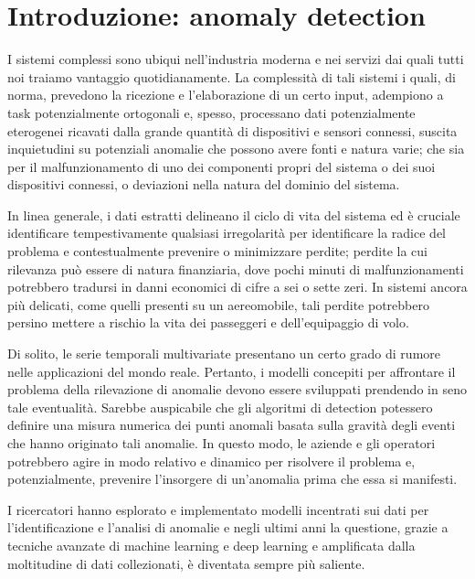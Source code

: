     

\chapter{Introduzione: anomaly detection} \label{cap:intro}
    I sistemi complessi sono ubiqui nell'industria moderna e nei servizi dai quali tutti noi traiamo vantaggio 
    quotidianamente. La complessità di 
    tali sistemi i quali, di norma, prevedono la ricezione e l'elaborazione di un certo input, adempiono a task 
    potenzialmente ortogonali e, spesso, processano dati potenzialmente eterogenei ricavati dalla grande 
    quantità di dispositivi e sensori connessi, suscita inquietudini su potenziali anomalie che possono avere
    fonti e natura varie; che sia per il malfunzionamento di uno dei componenti propri del sistema o 
    dei suoi dispositivi connessi, o deviazioni nella natura del dominio del sistema. 
    
    In linea generale, i dati estratti delineano il ciclo di vita del sistema ed è cruciale identificare tempestivamente
    qualsiasi irregolarità per identificare la radice del problema e 
    contestualmente prevenire o minimizzare perdite; perdite la cui rilevanza può essere di natura finanziaria, 
    dove pochi minuti di malfunzionamenti potrebbero tradursi in danni economici di cifre a sei o sette zeri. In sistemi ancora 
    più delicati, come quelli presenti su un aereomobile, tali perdite potrebbero persino mettere a 
    rischio la vita dei passeggeri e dell'equipaggio di volo.

    Di solito, le serie temporali multivariate presentano un certo grado di rumore nelle applicazioni del 
    mondo reale. Pertanto, i modelli concepiti per affrontare il problema della rilevazione di anomalie devono 
    essere sviluppati prendendo in seno tale eventualità. Sarebbe auspicabile che gli algoritmi di 
    detection potessero definire una misura numerica dei punti anomali basata sulla gravità degli eventi 
    che hanno originato tali anomalie. In questo modo, le aziende e gli operatori potrebbero agire in modo 
    relativo e dinamico per risolvere il problema e, potenzialmente, prevenire l'insorgere di un'anomalia 
    prima che essa si manifesti.

    I ricercatori hanno esplorato e implementato modelli incentrati sui dati per l'identificazione e l'analisi 
    di anomalie e negli ultimi anni la questione, grazie a tecniche avanzate di machine learning e deep 
    learning e amplificata dalla moltitudine di dati collezionati, è diventata sempre più saliente. 


